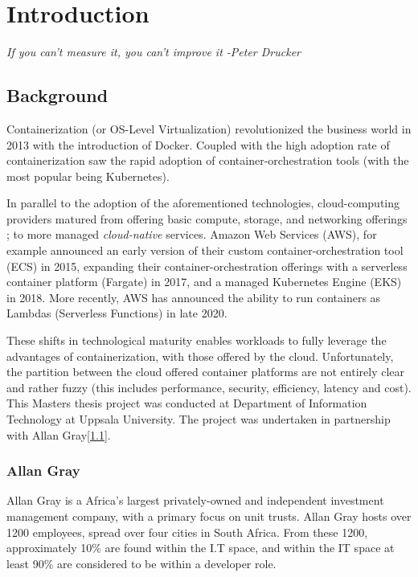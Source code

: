 \part{Introduction}
\label{sec:intro}
\textit{If you can't measure it, you can't improve it -Peter Drucker}

\chapter{Background}
Containerization (or OS-Level Virtualization) revolutionized the business world in 2013\cite{virtualization} with the introduction of Docker\cite{docker_usage}.
Coupled with the high adoption rate of containerization saw the rapid adoption of container-orchestration tools (with the most popular being Kubernetes\cite{k8s}).

In parallel to the adoption of the aforementioned technologies, cloud-computing providers matured from offering basic compute, storage,
and networking offerings \cite{barr_2009}; to more managed \textit{cloud-native} services. Amazon Web Services (AWS),
for example announced an early version of their custom container-orchestration tool (ECS) in 2015\cite{ecs},
expanding their container-orchestration offerings with a serverless container platform (Fargate) in 2017\cite{fargate},
and a managed Kubernetes Engine (EKS) in 2018\cite{eks}.
More recently, AWS has announced the ability to run containers as Lambdas (Serverless Functions) in late 2020\cite{lambda}.

\noindent These shifts in technological maturity enables workloads to fully leverage the advantages of containerization, with those offered by the cloud.
Unfortunately, the partition between the cloud offered container platforms are not entirely clear and rather fuzzy
(this includes performance, security, efficiency, latency and cost).\\

\noindent This Masters thesis project was conducted at Department of Information Technology at Uppsala University.
The project was undertaken in partnership with Allan Gray[\ref{sec:allan_gray}].

\section{Allan Gray}
\label{sec:allan_gray}
Allan Gray\cite{allan_gray} is a Africa's largest privately-owned and independent investment management company, with a primary focus on unit trusts.
Allan Gray hosts over 1200 employees, spread over four cities in South Africa. From these 1200, approximately 10\% are found within the I.T space,
and within the IT space at least 90\% are considered to be within a developer role.

